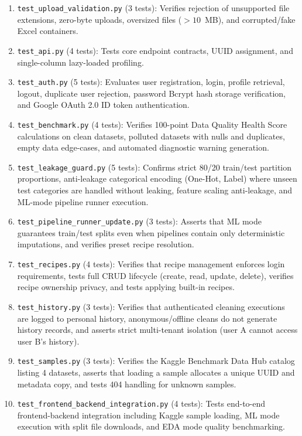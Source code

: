 \begin{enumerate}
  \item \texttt{test\_upload\_validation.py} (3 tests): Verifies rejection of unsupported file extensions, zero-byte uploads, oversized files ($>10$~MB), and corrupted/fake Excel containers.
  \item \texttt{test\_api.py} (4 tests): Tests core endpoint contracts, UUID assignment, and single-column lazy-loaded profiling.
  \item \texttt{test\_auth.py} (5 tests): Evaluates user registration, login, profile retrieval, logout, duplicate user rejection, password Bcrypt hash storage verification, and Google OAuth 2.0 ID token authentication.
  \item \texttt{test\_benchmark.py} (4 tests): Verifies 100-point Data Quality Health Score calculations on clean datasets, polluted datasets with nulls and duplicates, empty data edge-cases, and automated diagnostic warning generation.
  \item \texttt{test\_leakage\_guard.py} (5 tests): Confirms strict 80/20 train/test partition proportions, anti-leakage categorical encoding (One-Hot, Label) where unseen test categories are handled without leaking, feature scaling anti-leakage, and ML-mode pipeline runner execution.
  \item \texttt{test\_pipeline\_runner\_update.py} (3 tests): Asserts that ML mode guarantees train/test splits even when pipelines contain only deterministic imputations, and verifies preset recipe resolution.
  \item \texttt{test\_recipes.py} (4 tests): Verifies that recipe management enforces login requirements, tests full CRUD lifecycle (create, read, update, delete), verifies recipe ownership privacy, and tests applying built-in recipes.
  \item \texttt{test\_history.py} (3 tests): Verifies that authenticated cleaning executions are logged to personal history, anonymous/offline cleans do not generate history records, and asserts strict multi-tenant isolation (user A cannot access user B's history).
  \item \texttt{test\_samples.py} (3 tests): Verifies the Kaggle Benchmark Data Hub catalog listing 4 datasets, asserts that loading a sample allocates a unique UUID and metadata copy, and tests 404 handling for unknown samples.
  \item \texttt{test\_frontend\_backend\_integration.py} (4 tests): Tests end-to-end frontend-backend integration including Kaggle sample loading, ML mode execution with split file downloads, and EDA mode quality benchmarking.

\end{enumerate}
